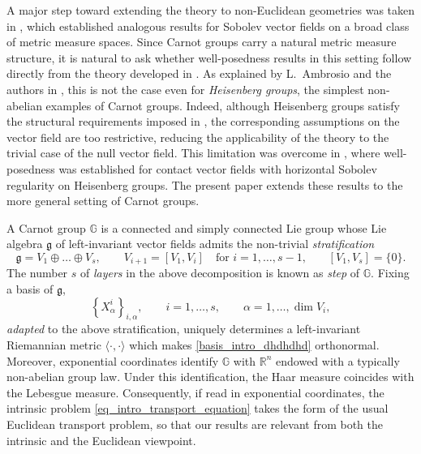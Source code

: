 \documentclass[11pt]{amsart}
\theoremstyle{plain}
\theoremstyle{definition}
\theoremstyle{remark}
\numberwithin{equation}{section}
\begin{document}
\medskip
A major step toward extending the theory to non-Euclidean geometries was taken in \cite{MR3265963}, which established analogous results for Sobolev vector fields on a broad class of metric measure spaces. Since Carnot groups carry a natural metric measure structure, it is natural to ask whether well-posedness results in this setting follow directly from the theory developed in \cite{MR3265963}. As explained by L.~Ambrosio and the authors in \cite[Section 6]{dpl1}, this is not the case even for \emph{Heisenberg groups}, the simplest non-abelian examples of Carnot groups. Indeed, although Heisenberg groups satisfy the structural requirements imposed in \cite{MR3265963}, the corresponding assumptions on the vector field are too restrictive, reducing the applicability of the theory to the trivial case of the null vector field. This limitation was overcome in \cite{dpl1}, where well-posedness was established for contact vector fields with horizontal Sobolev regularity on Heisenberg groups. The present paper extends these results to the more general setting of Carnot groups.

\medskip
A Carnot group $\mathbb G$ is a connected and simply connected Lie group whose Lie algebra $\mathfrak g$ of left-invariant vector fields admits the non-trivial \emph{stratification}
\begin{equation*}
\mathfrak{g}= V_1 \oplus \dots \oplus V_s, \qquad V_{i+1} = [V_1,V_i] \quad \text{for $i=1,\dots,s-1$,} \qquad [V_1,V_s]=\{0\}.
\end{equation*}
The number $s$ of \emph{layers} in the above decomposition is known as \emph{step} of $\mathbb G$. Fixing a basis of $\mathfrak g$,
\begin{equation}\label{basis_intro_dhdhdhd}
    \left\{X^i_\alpha\right\}_{i,\alpha},\qquad i=1,\dots,s,\qquad\alpha=1,\dots,\dim V_i,
\end{equation}
 \emph{adapted} to the above stratification, uniquely determines a left-invariant Riemannian metric $\langle\cdot,\cdot\rangle$ which makes \eqref{basis_intro_dhdhdhd} orthonormal. Moreover, exponential coordinates identify $\mathbb G$ with $\mathbb R^n$ endowed with a typically non-abelian group law. Under this identification, the Haar measure coincides with the Lebesgue measure. Consequently, if read in exponential coordinates, the intrinsic problem \eqref{eq_intro_transport_equation} takes the form of the usual Euclidean transport problem, so that our results are relevant from both the intrinsic and the Euclidean viewpoint.
\end{document}
